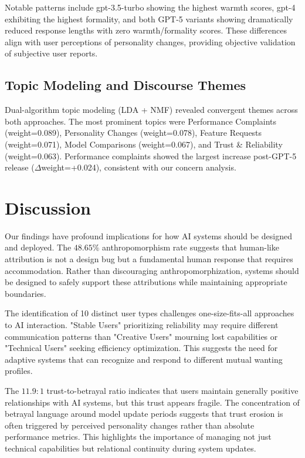 \documentclass{article}
\begin{document}
Notable patterns include gpt-3.5-turbo showing the highest warmth scores, gpt-4 exhibiting the highest formality, and both GPT-5 variants showing dramatically reduced response lengths with zero warmth/formality scores. These differences align with user perceptions of personality changes, providing objective validation of subjective user reports.

\subsection{Topic Modeling and Discourse Themes}

Dual-algorithm topic modeling (LDA + NMF) revealed convergent themes across both approaches. The most prominent topics were Performance Complaints (weight=0.089), Personality Changes (weight=0.078), Feature Requests (weight=0.071), Model Comparisons (weight=0.067), and Trust \& Reliability (weight=0.063). Performance complaints showed the largest increase post-GPT-5 release ($\Delta$weight=+0.024), consistent with our concern analysis.

\section{Discussion}

Our findings have profound implications for how AI systems should be designed and deployed. The $48.65\%$ anthropomorphism rate suggests that human-like attribution is not a design bug but a fundamental human response that requires accommodation. Rather than discouraging anthropomorphization, systems should be designed to safely support these attributions while maintaining appropriate boundaries.

The identification of 10 distinct user types challenges one-size-fits-all approaches to AI interaction. "Stable Users" prioritizing reliability may require different communication patterns than "Creative Users" mourning lost capabilities or "Technical Users" seeking efficiency optimization. This suggests the need for adaptive systems that can recognize and respond to different mutual wanting profiles.

The $11.9:1$ trust-to-betrayal ratio indicates that users maintain generally positive relationships with AI systems, but this trust appears fragile. The concentration of betrayal language around model update periods suggests that trust erosion is often triggered by perceived personality changes rather than absolute performance metrics. This highlights the importance of managing not just technical capabilities but relational continuity during system updates.
\end{document}
